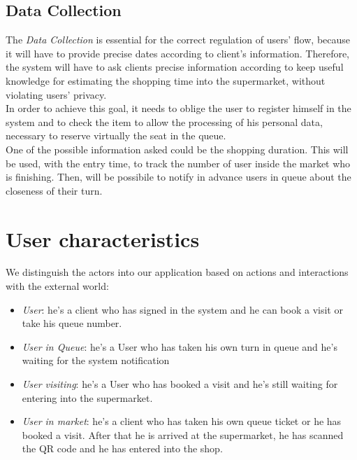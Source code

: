 \subsection{Data Collection}
The \textit{Data Collection} is essential for the correct regulation of users' flow, because it will have to provide precise dates according to client’s information. 
Therefore, the system will have to ask clients precise information according to keep useful knowledge for estimating the shopping time into the supermarket, without violating users’ privacy. 
\\
In order to achieve this goal, it needs to oblige the user to register himself in the system and to check the item to allow the processing of his personal data, necessary to reserve virtually the seat in the queue.
\\
One of the possible information asked could be the shopping duration. This will be used, with the entry time, to track the number of user inside the market who is finishing. Then, will be possibile to notify in advance users in queue about the closeness of their turn.

\section{User characteristics}
We distinguish the actors into our application based on actions and interactions with the external world:

\begin{itemize}
\item \textit{User}: he’s a client who has signed in the system and he can book a visit or take his queue number.
\item \textit{User in Queue}: he’s a User who has taken his own turn in queue and he’s waiting for the system notification
\item \textit{User visiting}: he’s a User who has booked a visit and he’s still waiting for entering into the supermarket.
\item \textit{User in market}: he’s a client who has taken his own queue ticket or he has booked a visit. After that he is arrived at the supermarket, he has scanned the QR code and he has entered into the shop.
\end{itemize}


